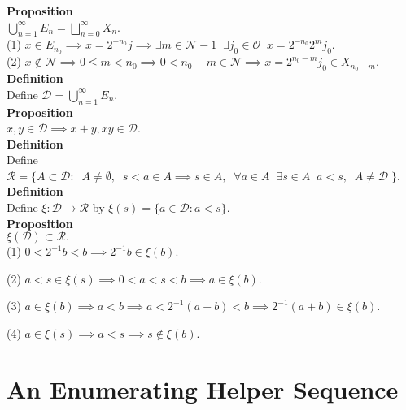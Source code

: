 \documentclass{article}
\newcommand{\odds}{ \mathscr{O}}
\newcommand{\targetset}{ \mathscr{R}}
\newcommand{\sourceset}{ \mathscr{D}}
\newcommand{\disjoints}{ X}
\newcommand{\nondisjoints}{E}
\newcommand{\naturals}{ \mathscr{N}}
\newcommand{\homo}{\xi}
\newcommand{\elt}{a}
\newcommand{\homoelt}{b}
\newcommand{\altelt}{s}
\newcommand{\odds}{ \mathscr{O}}
\begin{document}
\textbf{Proposition}\\
$\bigcup_{n = 1}^\infty \nondisjoints_n =  \bigsqcup_{n= 0}^\infty \disjoints_n$.\\

(1) $x \in E_{n_0} \implies x = 2^{-n_0}j \implies \exists m \in \naturals - 1 \;\; \exists j_0 \in \odds \;\; x= 2^{-n_0}2^mj_0$.\\ 
(2) $x \notin \naturals \implies 0 \le m < n_0 \implies 0 < n_0 - m \in \naturals \implies x = 2^{n_0-m}j_0 \in \disjoints_{n_0-m}$.\\ 

\textbf{Definition}\\
Define $\sourceset = \bigcup_{n = 1}^\infty \nondisjoints_n$.\\

\textbf{Proposition}\\
$x,y \in \sourceset \implies  x+y,xy \in \sourceset$.\\

\textbf{Definition}\\
Define $\targetset = \{A \subset \sourceset : \;\; A \ne \emptyset,\;\; \altelt < \elt \in A \implies \altelt \in A,\;\; \forall \elt \in A \;\; \exists \altelt  \in A \;\; \elt < \altelt , \;\; A \ne \sourceset \; \}$.\\

\textbf{Definition}\\
Define $\homo : \sourceset \to \targetset$ by $\homo(\altelt)  = \{ \elt \in \sourceset : \elt < \altelt \}$.\\

\textbf{Proposition}\\
$\homo(\sourceset) \subset \targetset.$\\

(1) $0 < 2^{-1}\homoelt < \homoelt \implies 2^{-1}\homoelt \in \homo(\homoelt)$. 

(2) $\elt < \altelt \in \homo(\altelt) \implies 0 < \elt < \altelt < \homoelt \implies \elt \in \homo(\homoelt).$ 

(3) $\elt \in \homo(\homoelt) \implies \elt < \homoelt \implies \elt < 2^{-1}(\elt+ \homoelt) < \homoelt \implies 2^{-1}(\elt+ \homoelt) \in \homo(\homoelt)$. 

(4) $\elt \in \homo(\altelt) \implies \elt < \altelt \implies \altelt \notin\homo(\homoelt)$.\\


\section{An Enumerating Helper Sequence}\\
\end{document}
